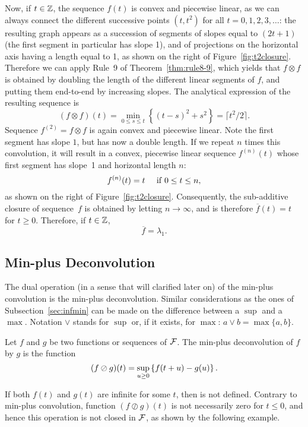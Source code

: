Now, if  $t \in \mathbb{Z}$, the sequence $f(t)$ is convex and piecewise linear, as we can always connect
 the different successive points $(t, t^2)$ for all $t = 0, 1, 2, 3, \ldots $: the resulting graph
 appears as a succession of segments of slopes equal to $(2t + 1)$ (the first segment in particular has slope 1),
 and of projections on the horizontal axis having a length equal to 1, as shown on the right of
  Figure~\ref{fig:t2closure}.
 Therefore we can apply Rule~9 of Theorem~\ref{thm:rule8-9}, which yields that $f \otimes f$ is
 obtained by doubling the length of the different linear segments of $f$,
 and putting them end-to-end by increasing slopes. The analytical expression of the resulting sequence is
 $$ (f \otimes f)(t) = \min_{0 \leq s \leq t} \left\{ (t-s)^2 + s^2 \right\} = \lceil t^2/2 \rceil . $$
Sequence $f^{(2)} = f \otimes f $ is again convex and piecewise linear. Note the first segment has slope $1$,
but has now a double length. If we repeat $n$ times this convolution, it will result in a convex,
piecewise linear sequence $ f^{(n)}(t) $ whose first segment has slope~1 and horizontal length $n$:
$$ f^{(n)}(t) = t  \;\;\;\;\mathrm{\; if \; } 0 \leq t \leq n, $$
as shown on the right of  Figure~\ref{fig:t2closure}.
Consequently, the sub-additive closure of sequence~$f$ is obtained by letting $n \rightarrow \infty$,
and is therefore $ \overline{f}(t) = t $ for $t \geq 0$.
Therefore, if $t \in \mathbb{Z}$,
$$ \overline{f} = \lambda_1. $$

\subsection{Min-plus Deconvolution}
The dual operation (in a sense that will clarified later on) of the min-plus convolution
is the min-plus deconvolution. Similar considerations as the ones of Subsection~\ref{sec:infmin}
can be made on the difference between a $\sup $ and a $\max$. Notation $\vee$ stands for $\sup$ or,
if it exists, for $\max$: $ a \vee b = \max \{ a, b \}$.
\begin{definition}
Let $f$ and $g$ be two functions or sequences of $\mathcal F$. The min-plus deconvolution of $f$ by $g$
is the function
\begin{equation}
\mylabel{eq:minplusdeconvolution}
(f \oslash g)(t) = \sup_{u \geq 0} \left\{ f(t+u) - g(u) \right\}.
\end{equation}
\end{definition}
If both $f(t)$ and $g(t)$ are infinite for some $t$, then
 is not defined. Contrary to
min-plus convolution, function $(f \oslash g)(t)$ is not
necessarily zero for $t \leq 0$, and hence this operation is not
closed in $\mathcal F$, as shown by the following example. \noindent

